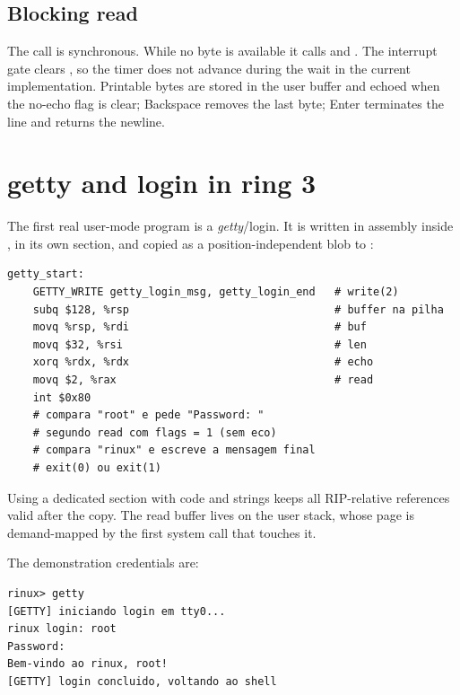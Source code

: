 \subsection{Blocking read}

The  call is synchronous. While no byte is available it calls
 and . The interrupt gate clears
, so the timer does not advance during the wait in the current
implementation. Printable bytes are stored in the user buffer and echoed when
the no-echo flag is clear; Backspace removes the last byte; Enter terminates
the line and returns the newline.

\section{getty and login in ring 3}

The first real user-mode program is a \emph{getty}/login. It is written in
assembly inside , in its own section, and copied as a
position-independent blob to :

\begin{lstlisting}[caption={Login flow of the ring 3 program.},label={lst:gettyasm}]
getty_start:
    GETTY_WRITE getty_login_msg, getty_login_end   # write(2)
    subq $128, %rsp                                # buffer na pilha
    movq %rsp, %rdi                                # buf
    movq $32, %rsi                                 # len
    xorq %rdx, %rdx                                # echo
    movq $2, %rax                                  # read
    int $0x80
    # compara "root" e pede "Password: "
    # segundo read com flags = 1 (sem eco)
    # compara "rinux" e escreve a mensagem final
    # exit(0) ou exit(1)
\end{lstlisting}

Using a dedicated section with code and strings keeps all RIP-relative
references valid after the copy. The read buffer lives on the user stack,
whose page is demand-mapped by the first system call that touches it.

The demonstration credentials are:

\begin{lstlisting}[style=shell,caption={Successful login.},label={lst:gettyout}]
rinux> getty
[GETTY] iniciando login em tty0...
rinux login: root
Password:
Bem-vindo ao rinux, root!
[GETTY] login concluido, voltando ao shell
\end{lstlisting}

